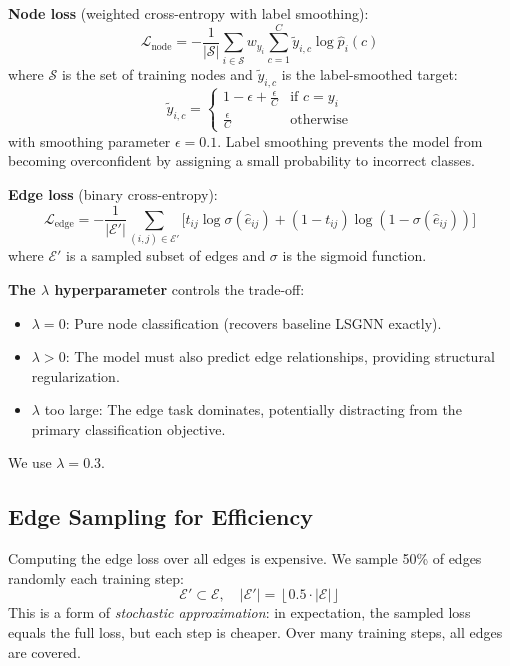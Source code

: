 \documentclass[conference]{IEEEtran}
\newcommand{\E}{\mathcal{E}}
\newcommand{\Loss}{\mathcal{L}}
\begin{document}
\textbf{Node loss} (weighted cross-entropy with label smoothing):
\begin{equation}
    \Loss_{\text{node}} = -\frac{1}{|\mathcal{S}|} \sum_{i \in \mathcal{S}} w_{y_i} \sum_{c=1}^{C} \tilde{y}_{i,c} \log \hat{p}_i(c)
\end{equation}
where $\mathcal{S}$ is the set of training nodes and $\tilde{y}_{i,c}$ is the label-smoothed target:
\begin{equation}
    \tilde{y}_{i,c} = \begin{cases} 1 - \epsilon + \frac{\epsilon}{C} & \text{if } c = y_i \\ \frac{\epsilon}{C} & \text{otherwise} \end{cases}
\end{equation}
with smoothing parameter $\epsilon = 0.1$. Label smoothing prevents the model from becoming overconfident by assigning a small probability to incorrect classes.

\textbf{Edge loss} (binary cross-entropy):
\begin{equation}
    \Loss_{\text{edge}} = -\frac{1}{|\E'|} \sum_{(i,j) \in \E'} \Big[ t_{ij} \log \sigma(\hat{e}_{ij}) + (1 - t_{ij}) \log(1 - \sigma(\hat{e}_{ij})) \Big]
\end{equation}
where $\E'$ is a sampled subset of edges and $\sigma$ is the sigmoid function.

\textbf{The $\lambda$ hyperparameter} controls the trade-off:
\begin{itemize}
    \item $\lambda = 0$: Pure node classification (recovers baseline LSGNN exactly).
    \item $\lambda > 0$: The model must also predict edge relationships, providing structural regularization.
    \item $\lambda$ too large: The edge task dominates, potentially distracting from the primary classification objective.
\end{itemize}
We use $\lambda = 0.3$.

\subsection{Edge Sampling for Efficiency}

Computing the edge loss over all edges is expensive. We sample 50\% of edges randomly each training step:
\begin{equation}
    \E' \subset \E, \quad |\E'| = \left\lfloor 0.5 \cdot |\E| \right\rfloor
\end{equation}
This is a form of \emph{stochastic approximation}: in expectation, the sampled loss equals the full loss, but each step is cheaper. Over many training steps, all edges are covered.
\end{document}
